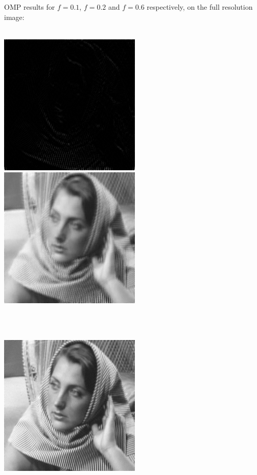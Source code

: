 \documentclass[letterpaper, 10 pt, conference]{article}
\begin{document}
\noindent OMP results for $f=0.1$, $f=0.2$ and $f=0.6$ respectively, on the full resolution image: \\ \\
\centerline{\includegraphics[scale=0.5]{out-omp4x-10p} \includegraphics[scale=0.5]{out-omp4x-20p}} \\ \\
\centerline{ \includegraphics[scale=0.5]{out-omp4x-60p}} \\ \\
\end{document}
